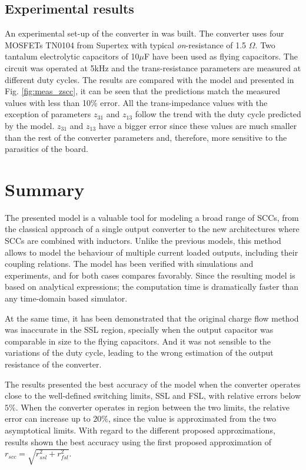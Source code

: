\subsection{Experimental results}
An experimental set-up of the converter in was built. The converter uses four MOSFETs TN0104 from Supertex with typical \emph{on}-resistance of 1.5 $\Omega$. Two tantalum electrolytic capacitors of 10$\mu$F have been used as flying capacitors. The circuit was operated at 5kHz and the trans-resistance parameters are measured at different duty cycles. The results are compared with the model and  presented in Fig. \ref{fig:meas_zscc}, it can be seen that the predictions match the measured values with less than 10\% error. All the trans-impedance values with the exception of  parameters $z_{31}$ and $z_{13}$ follow the trend with the duty cycle predicted by the model. $z_{31}$ and $z_{13}$ have a bigger error since these values are much smaller than the rest of the converter parameters and, therefore, more sensitive to the parasitics of the board.


\section{Summary}
The presented model is a valuable tool for  modeling a broad range of SCCs, from the classical approach of a single output converter to the new architectures where SCCs are combined with inductors. Unlike the previous models, this method allows to model the behaviour of multiple current loaded outputs, including their coupling relations. The model has been verified with simulations and experiments, and for both cases compares favorably. Since the resulting model is based on analytical expressions; the computation time is dramatically faster than any time-domain based simulator.

At the same time, it has been demonstrated that the original charge flow method was inaccurate in the SSL region, specially when the output capacitor was comparable in size to the flying capacitors. And it was not sensible to the variations of the duty cycle, leading to the wrong estimation of the output resistance of the converter.

The results presented the best accuracy of the model when the converter operates close to the well-defined switching limits, SSL and FSL, with relative errors below $5\%$. When the converter operates in region between the two limits, the relative error can increase up to $20\%$, since the value is approximated from the two asymptotical limits. With regard to the different proposed approximations, results shown the best accuracy using the first proposed approximation of $r_{scc} = \sqrt{r_{ssl}^2 + r_{fsl}^2}$.

\clearpage

 